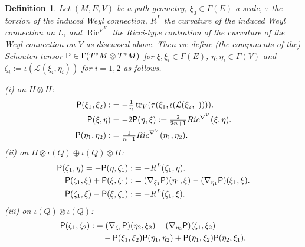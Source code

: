 \documentclass[11pt]{amsart}
\def\Rho{\mbox{\textsf{P}}}
\newcommand{\tr}{\operatorname{tr}}
\newcommand{\Ric}{\operatorname{Ric}}
\newtheorem{definition}[proposition]{Definition}
\numberwithin{proposition}{section}
\numberwithin{equation}{section}
\begin{document}
\begin{definition}\label{def-Rho}
Let $(M,E,V)$ be a path geometry, $\xi_0\in\Gamma(E)$ a scale, $\tau$ the torsion of the induced Weyl connection, $R^L$ the curvature of the induced Weyl connection on $L$, and $\Ric^{\nabla^V}$ the Ricci-type contration of the curvature of the Weyl connection on $V$ as discussed above. Then we define (the components of the) Schouten tensor $\Rho\in\Gamma(T^*M\otimes T^*M)$ for $\xi,\xi_i\in\Gamma(E)$, $\eta,\eta_i\in\Gamma(V)$ and $\zeta_i:=\iota(\mathcal L(\xi_i,\eta_i))$ for $i=1,2$ as follows. 

(i) on $H\otimes H$:
\begin{align*}
      \Rho(\xi_1,\xi_2):&=-\tfrac 1 n \tr_V(\tau(\xi_1,\iota(\mathcal L(\xi_2,\ )))).\\
      \Rho(\xi,\eta)&=-2\Rho(\eta,\xi):=\tfrac{2}{2n+1}Ric^{\nabla^V}(\xi,\eta).\\
      \Rho(\eta_1,\eta_2):&=\tfrac{1}{n-1}Ric^{\nabla^V}(\eta_1,\eta_2). 
\end{align*}
(ii) on $H\otimes\iota(Q)\oplus\iota(Q)\otimes H$: 
\begin{align*}
    \Rho(\zeta_1,\eta)=-\Rho(\eta,\zeta_1):&=-R^L(\zeta_1,\eta).\\
\Rho(\zeta_1,\xi)+\Rho(\xi,\zeta_1):
&=(\nabla_{\xi_1}\Rho)(\eta_1,\xi)-(\nabla_{\eta_1}\Rho)(\xi_1,\xi).\\
\Rho(\zeta_1,\xi)-\Rho(\xi,\zeta_1):&=-R^L(\zeta_1,\xi).
\end{align*}
(iii) on $\iota(Q)\otimes\iota(Q)$: 
\begin{align*}
\Rho(\zeta_1,\zeta_2):&=(\nabla_{\zeta_1}\Rho)(\eta_2,\xi_2)-(\nabla_{\eta_2}\Rho)(\zeta_1,\xi_2)\\
&\quad -\Rho(\xi_1,\xi_2)\Rho(\eta_1,\eta_2)+\Rho(\eta_1,\xi_2)\Rho(\eta_2,\xi_1).
\end{align*}
\end{definition}
\end{document}
